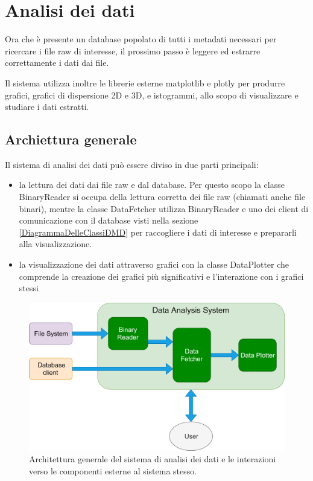 \chapter{Analisi dei dati}
\label{AnalisiDeiDati}
Ora che è presente un database popolato di tutti i metadati necessari per ricercare i file raw di interesse, il prossimo passo è leggere ed estrarre correttamente i dati dai file.

Il sistema utilizza inoltre le librerie esterne matplotlib e plotly per produrre grafici, grafici di dispersione 2D e 3D, e istogrammi, allo scopo di visualizzare e studiare i dati estratti.

\section{Archiettura generale}

Il sistema di analisi dei dati può essere diviso in due parti principali:

\begin{itemize}
	\item la lettura dei dati dai file raw e dal database. Per questo scopo la classe BinaryReader si occupa della lettura corretta dei file raw (chiamati anche file binari), mentre la classe DataFetcher utilizza BinaryReader e uno dei client di comunicazione con il database visti nella sezione \ref{DiagrammaDelleClassiDMD} per raccogliere i dati di interesse e prepararli alla visualizzazione.
	\item la visualizzazione dei dati attraverso grafici con la classe DataPlotter che comprende la creazione dei grafici più significativi e l'interazione con i grafici stessi
\end{itemize}

\begin{figure}
	\includegraphics[width=\textwidth]{figures/ArchitetturaDA}
	\caption[Architettura del sistema di analisi dei dati]{ Architettura generale del sistema di analisi dei dati  e le interazioni verso le componenti esterne al sistema stesso.
		\label{fig:ArchitetturaDA}}
\end{figure}


